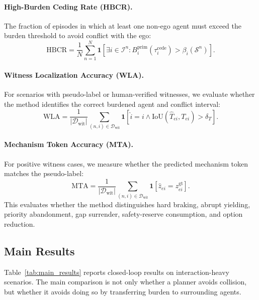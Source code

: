 \documentclass[10pt]{article}
\begin{document}
\paragraph{High-Burden Ceding Rate (HBCR).}
The fraction of episodes in which at least one non-ego agent must exceed the burden threshold to avoid conflict with the ego:
\begin{equation}
    \mathrm{HBCR}
    =
    \frac{1}{N}
    \sum_{n=1}^{N}
    \mathbf{1}
    [
    \exists i\in\mathcal{I}^n:
    B_i^{\mathrm{prim}}(\tau_i^{\mathrm{cede}})>\beta_i(\mathcal{S}^n)
    ].
\end{equation}

\paragraph{Witness Localization Accuracy (WLA).}
For scenarios with pseudo-label or human-verified witnesses, we evaluate whether the method identifies the correct burdened agent and conflict interval:
\begin{equation}
    \mathrm{WLA}
    =
    \frac{1}{|\mathcal{D}_{\mathrm{wit}}|}
    \sum_{(n,i)\in\mathcal{D}_{\mathrm{wit}}}
    \mathbf{1}
    [
    \widehat{i}=i
    \wedge
    \mathrm{IoU}(\widehat{T}_{ei},T_{ei})>\delta_T
    ].
\end{equation}

\paragraph{Mechanism Token Accuracy (MTA).}
For positive witness cases, we measure whether the predicted mechanism token matches the pseudo-label:
\begin{equation}
    \mathrm{MTA}
    =
    \frac{1}{|\mathcal{D}_{\mathrm{wit}}|}
    \sum_{(n,i)\in\mathcal{D}_{\mathrm{wit}}}
    \mathbf{1}
    [
    \widehat{z}_{ei}=z^{\mathrm{gt}}_{ei}
    ].
\end{equation}
This evaluates whether the method distinguishes hard braking, abrupt yielding, priority abandonment, gap surrender, safety-reserve consumption, and option reduction.

\subsection{Main Results}
\label{sec:main_results}

Table~\ref{tab:main_results} reports closed-loop results on interaction-heavy scenarios. The main comparison is not only whether a planner avoids collision, but whether it avoids doing so by transferring burden to surrounding agents.
\end{document}
